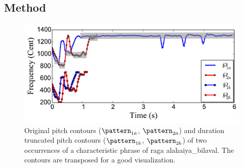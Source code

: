 

\subsection{Method}
\label{sec:patterns_improving_similarity_method}

\begin{figure}
	\begin{center}
		\includegraphics[width=\figSizeEightyFive]{ch06_patterns/figures/ImprovingSimilarity/Hindusani_flat_note_compression_example_reversed.pdf}
	\end{center}
	\caption[Example of melodic patterns after duration truncation]{Original pitch contours ($\pattern_{1a}$, $\pattern_{2a}$) and duration truncated pitch contours ($\pattern_{1b}$, $\pattern_{2b}$) of two occurrences of a characteristic phrase of \gls{raga} \gls{alahaiya_bilaval}. The contours are transposed for a good visualization.}
	\label{fig:flatCompressionExample}
\end{figure}



